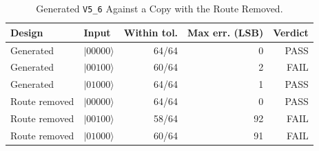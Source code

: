 \begin{table}[ht]
\centering
\caption{Generated \texttt{V5\_6} Against a Copy with the Route Removed.}
\label{tab:route}
\begin{tabular}{@{}llrrr@{}}
\toprule
Design & Input & Within tol. & Max err. (LSB) & Verdict \\
\midrule
Generated & $|00000\rangle$ & 64/64 & 0 & PASS \\
Generated & $|00100\rangle$ & 60/64 & 2 & FAIL \\
Generated & $|01000\rangle$ & 64/64 & 1 & PASS \\
Route removed & $|00000\rangle$ & 64/64 & 0 & PASS \\
Route removed & $|00100\rangle$ & 58/64 & 92 & FAIL \\
Route removed & $|01000\rangle$ & 60/64 & 91 & FAIL \\
\bottomrule
\end{tabular}
\end{table}
